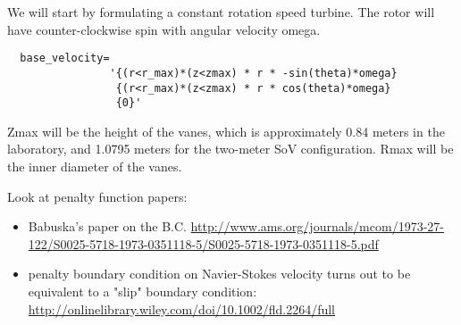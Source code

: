 \documentclass{article}
\begin{document}
We will start by formulating a constant rotation speed
turbine. The rotor will have counter-clockwise spin with angular
velocity omega.   

\begin{verbatim}
  base_velocity=
                '{(r<r_max)*(z<zmax) * r * -sin(theta)*omega}
                 {(r<r_max)*(z<zmax) * r * cos(theta)*omega}
                 {0}'
\end{verbatim}

Zmax will be the height of the vanes, which is approximately 0.84 meters in the laboratory, 
and 1.0795 meters for the two-meter SoV configuration. Rmax will be the inner diameter of the vanes. 

%

Look at penalty function papers: 
\begin{itemize}
 \item Babuska's paper on the B.C. \url{http://www.ams.org/journals/mcom/1973-27-122/S0025-5718-1973-0351118-5/S0025-5718-1973-0351118-5.pdf}
 \item penalty boundary condition on Navier-Stokes velocity turns out to be equivalent to a "slip" boundary condition: \url{http://onlinelibrary.wiley.com/doi/10.1002/fld.2264/full}
\end{itemize}
\end{document}
